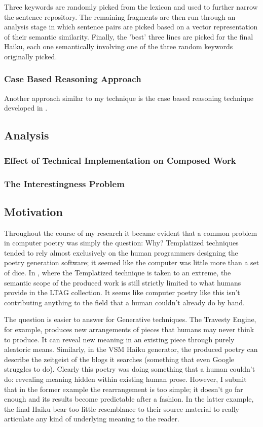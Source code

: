 \documentclass[10pt]{article}
\begin{document}
Three keywords are randomly picked from the lexicon and used to further narrow
the sentence repository. The remaining fragments are then run through an
analysis stage in which sentence pairs are picked based on a vector
representation of their semantic similarity. Finally, the 'best' three lines
are picked for the final Haiku, each one semantically involving one of the
three random keywords originally picked.

\subsubsection{Case Based Reasoning Approach}
Another approach similar to my technique is the case based reasoning technique
developed in \cite{Gervas01}.

\subsection{Analysis}
\subsubsection{Effect of Technical Implementation on Composed Work}
\subsubsection{The Interestingness Problem}
\subsection{Motivation}
Throughout the course of my research it became evident that a common problem in
computer poetry was simply the question: Why? Templatized techniques tended to
rely almost exclusively on the human programmers designing the poetry
generation software; it seemed like the computer was little more than a set of
dice. In \cite{Manurung03}, where the Templatized technique is taken to an
extreme, the semantic scope of the produced work is still strictly limited to
what humans provide in the LTAG collection. It seems like computer poetry like
this isn't contributing anything to the field that a human couldn't already do
by hand.

The question is easier to answer for Generative techniques. The Travesty
Engine, for example, produces new arrangements of pieces that humans may never
think to produce. It can reveal new meaning in an existing piece through purely
aleatoric means. Similarly, in the VSM Haiku generator, the produced poetry can
describe the zeitgeist of the blogs it searches (something that even Google
struggles to do). Clearly this poetry was doing something that a human couldn't
do: revealing meaning hidden within existing human prose. However, I submit
that in the former example the rearrangement is too simple; it doesn't go far
enough and its results become predictable after a fashion. In the latter
example, the final Haiku bear too little resemblance to their source material
to really articulate any kind of underlying meaning to the reader.
\end{document}
